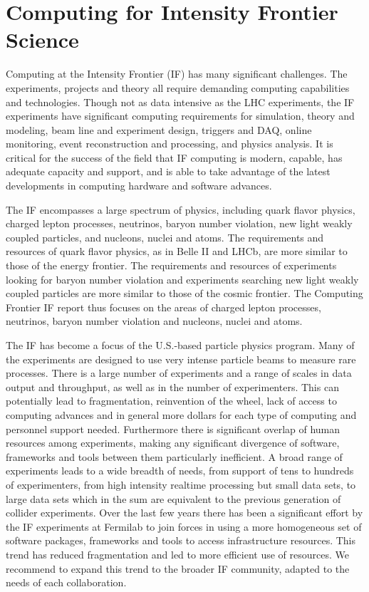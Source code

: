 \section{Computing for Intensity Frontier Science}

Computing at the Intensity Frontier (IF) has many significant challenges. The
experiments, projects and theory all require demanding computing capabilities
and technologies.  Though not as data intensive as the LHC experiments, the IF
experiments have significant computing requirements for simulation,  theory
and modeling, beam line and experiment design, triggers and DAQ, online
monitoring, event reconstruction and processing, and physics analysis.  It is
critical for the success of the field that IF computing is modern, capable,
has adequate capacity and support, and is able to take advantage of the latest
developments in computing hardware and software advances.

The IF encompasses a large spectrum of physics, including quark flavor
physics,  charged lepton processes, neutrinos, baryon number violation,  new
light weakly coupled particles, and nucleons, nuclei and atoms.  The
requirements and resources of quark flavor physics, as in Belle II and LHCb,
are more similar to those of the energy frontier. The requirements and
resources of  experiments looking for baryon number violation and  experiments
searching new light weakly coupled particles are more similar to  those of the
cosmic frontier.  The Computing Frontier IF report thus focuses on the areas
of charged lepton processes,  neutrinos, baryon number violation and nucleons,
nuclei and atoms.

The IF has become a focus of the U.S.-based particle physics program. Many  of
the experiments are designed to use very intense particle beams to measure
rare processes. There is a large number of experiments and a range of scales
in data output and throughput, as well as in the number of experimenters.
This can potentially lead to fragmentation, reinvention of the wheel, lack of
access to computing advances and in general more dollars for each type of
computing and personnel support needed. Furthermore there is significant
overlap of human resources among experiments, making any significant
divergence of  software, frameworks and tools between them particularly
inefficient.  A broad range of experiments leads to a wide breadth of needs,
from support of tens to hundreds of experimenters, from high intensity
realtime processing but small data sets, to large data sets which in the sum
are equivalent to the previous generation of collider experiments. Over the
last few years there has been a significant effort by the IF experiments at
Fermilab to join forces in using a more homogeneous set of software packages,
frameworks and tools to access infrastructure resources. This trend has
reduced fragmentation and led to more efficient use of resources. We recommend
to expand this trend to the broader IF community, adapted to the needs of each
collaboration.

